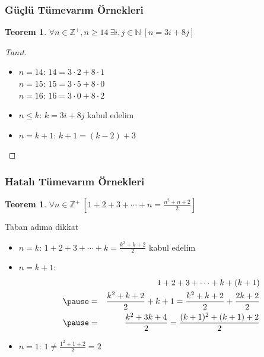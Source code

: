 \documentclass[dvipsnames]{beamer}
\theoremstyle{definition}
\theoremstyle{example}
\theoremstyle{plain}
\newtheorem{teorem}[theorem]{Teorem}
\begin{document}
\begin{frame}
  \frametitle{Güçlü Tümevarım Örnekleri}

  \begin{teorem}
    $\forall n \in \mathbb{Z}^+, n \geq 14~\exists i,j \in \mathbb{N}~[n=3i+8j]$
  \end{teorem}

  \pause
  \begin{proof}[Tanıt]
    \begin{itemize}
      \item $n=14$: $14=3 \cdot 2 + 8 \cdot 1$\\
        $n=15$: $15=3 \cdot 5 + 8 \cdot 0$\\
        $n=16$: $16=3 \cdot 0 + 8 \cdot 2$

      \pause
      \item $n \leq k$: $k=3i+8j$ kabul edelim

      \pause
      \item $n=k+1$: $k+1=(k-2)+3$
    \end{itemize}
  \end{proof}
\end{frame}

\begin{frame}
  \frametitle{Hatalı Tümevarım Örnekleri}

  \begin{teorem}
    $\forall n \in \mathbb{Z}^+~[1+2+3+\cdots+n=\frac{n^2+n+2}{2}]$
  \end{teorem}

  \pause
  \begin{block}{Taban adıma dikkat}
    \begin{itemize}
      \item $n=k$: $1+2+3+\cdots+k=\frac{k^2+k+2}{2}$ kabul edelim

      \pause
      \item $n=k+1$:
      \begin{eqnarray*}
        &   & 1+2+3+\cdots+k+(k+1)\\\pause
        & = & \frac{k^2+k+2}{2}+k+1
          =   \frac{k^2+k+2}{2}+\frac{2k+2}{2}\\\pause
        & = & \frac{k^2+3k+4}{2}
          =   \frac{(k+1)^2+(k+1)+2}{2}
      \end{eqnarray*}

      \pause
      \item $n=1$: $1 \neq \frac{1^2+1+2}{2}=2$
    \end{itemize}
  \end{block}
\end{frame}
\end{document}
